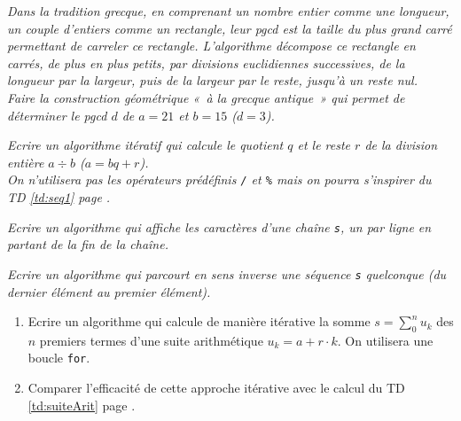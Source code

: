 \begin{td}\label{td:euclide}
\em
Dans la tradition grecque, en comprenant un nombre entier comme une longueur, 
un couple d'entiers comme un rectangle, leur pgcd est la taille du plus grand 
carré permettant de carreler ce rectangle. L'algorithme décompose ce rectangle 
en carrés, de plus en plus petits, par divisions euclidiennes successives, 
de la longueur par la largeur, puis de la largeur par le reste, 
jusqu'à un reste nul.\\
Faire la construction géométrique «~à la grecque antique~» qui permet de déterminer 
le pgcd $d$ de $a=21$ et $b=15$ ($d=3$).
\end{td}

\begin{td}\label{td:division}
\em
Ecrire un algorithme itératif qui calcule le quotient $q$ et le reste $r$ de la 
division entière $a\div b$ ($a = bq+r$).\\
On n'utilisera pas les opérateurs prédéfinis {\tt /} et {\tt \%} mais
on pourra s'inspirer du TD \ref{td:seq1} page \pageref{td:seq1}.
\end{td}


\begin{td}\label{td:caractere}
\em
Ecrire un algorithme qui affiche les caractères d'une chaîne {\tt s},
un par ligne en partant de la fin de la chaîne.
\end{td}

\begin{td}\label{td:parcours}
\em
Ecrire un algorithme qui parcourt en sens inverse une séquence {\tt s}
quelconque (du dernier élément au premier élément).
\end{td}

\begin{td}\label{td:suiteArit2}
\em
\begin{enumerate}
\item Ecrire un algorithme qui calcule de manière itérative la somme $s = \sum_0^n u_k$ des $n$ premiers 
	termes d'une suite arithmétique $u_k = a + r\cdot k$. On utilisera une boucle {\tt for}.
\item Comparer l'efficacité de cette approche itérative avec le calcul du TD \ref{td:suiteArit} 
	page \pageref{td:suiteArit}.
\end{enumerate}
\end{td}


